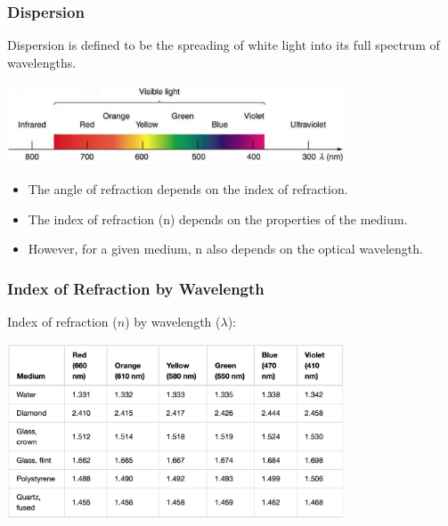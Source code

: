 \documentclass{beamer}
\begin{document}
\begin{frame}\frametitle{Dispersion}
Dispersion is defined to be the spreading of white light into its full spectrum of wavelengths.

\begin{center}
\includegraphics[width=10cm]{fig/rainbow.jpg}
\end{center}

\begin{itemize}
\item The angle of refraction depends on the index of refraction.
\item The index of refraction (n) depends on the properties of the medium.
\item However, for a given medium, n also depends on the optical wavelength.
\end{itemize}


\end{frame}

\begin{frame}\frametitle{Index of Refraction by Wavelength}
Index of refraction ($n$) by wavelength ($\lambda$):

\begin{center}
\includegraphics[width=10cm]{fig/nbylambda.jpg}
\end{center}
\end{frame}
\end{document}
